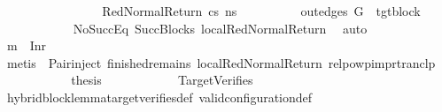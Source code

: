 \begin{isabellebody}
\isanewline
\ \ \ \ \ \ \isamarkupfalse%
\isanewline
\ \ \ \ \ \ \ \ \isamarkupfalse%
\ {\isacharparenleft}{\kern0pt}RedNormalReturn\ cs\ ns{\isacharprime}{\kern0pt}{\isacharparenright}{\kern0pt}\isanewline
\ \ \ \ \ \ \ \ \isamarkupfalse%
\ {\isachardoublequoteopen}out{\isacharunderscore}{\kern0pt}edges\ G{\isacharprime}{\kern0pt}\ {\isacharbang}{\kern0pt}\ tgt{\isacharunderscore}{\kern0pt}block\ {\isacharequal}{\kern0pt}\ {\isacharbrackleft}{\kern0pt}{\isacharbrackright}{\kern0pt}{\isachardoublequoteclose}\isanewline
\ \ \ \ \ \ \ \ \ \ \isamarkupfalse%
\ NoSuccEq\ SuccBlocks\ local{\isachardot}{\kern0pt}RedNormalReturn{\isacharparenleft}{\kern0pt}{}{\isacharparenright}{\kern0pt}\ \isamarkupfalse%
\ auto\isanewline
\ \ \ \ \ \ \ \ \isamarkupfalse%
\ {\isachardoublequoteopen}m{\isacharprime}{\kern0pt}\ {\isacharequal}{\kern0pt}\ Inr{\isacharparenleft}{\kern0pt}{\isacharparenright}{\kern0pt}{\isachardoublequoteclose}\isanewline
\ \ \ \ \ \ \ \ \ \ \isamarkupfalse%
\ {\isacharparenleft}{\kern0pt}metis\ {\isachardoublequoteopen}{}{\isachardoublequoteclose}{\isacharparenleft}{\kern0pt}{}{\isacharparenright}{\kern0pt}\ Pair{\isacharunderscore}{\kern0pt}inject\ finished{\isacharunderscore}{\kern0pt}remains\ local{\isachardot}{\kern0pt}RedNormalReturn{\isacharparenleft}{\kern0pt}{}{\isacharparenright}{\kern0pt}\ relpowp{\isacharunderscore}{\kern0pt}imp{\isacharunderscore}{\kern0pt}rtranclp{\isacharparenright}{\kern0pt}\isanewline
\ \ \ \ \ \ \ \ \isamarkupfalse%
\ \isamarkupfalse%
\ {\isacharquery}{\kern0pt}thesis\isanewline
\ \ \ \ \ \ \ \ \ \ \isamarkupfalse%
\ TargetVerifies\isanewline
\ \ \ \ \ \ \ \ \ \ \isamarkupfalse%
\ hybrid{\isacharunderscore}{\kern0pt}block{\isacharunderscore}{\kern0pt}lemma{\isacharunderscore}{\kern0pt}target{\isacharunderscore}{\kern0pt}verifies{\isacharunderscore}{\kern0pt}def\ valid{\isacharunderscore}{\kern0pt}configuration{\isacharunderscore}{\kern0pt}def\isanewline
\ \ \ \ \ \ \ \ \ \ \isamarkupfalse%

\end{isabellebody}
